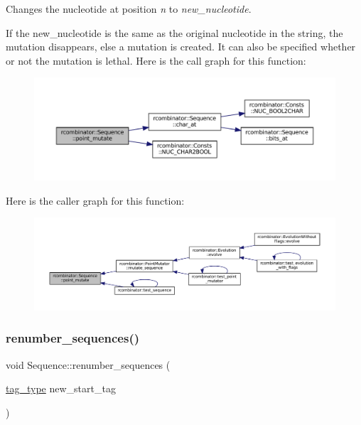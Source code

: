 Changes the nucleotide at position {\itshape n} to {\itshape new\+\_\+nucleotide}. 

If the new\+\_\+nucleotide is the same as the original nucleotide in the string, the mutation disappears, else a mutation is created. It can also be specified whether or not the mutation is lethal. Here is the call graph for this function\+:
\nopagebreak
\begin{figure}[H]
\begin{center}
\leavevmode
\includegraphics[width=350pt]{classrcombinator_1_1Sequence_a85299c3dbf2efb993a43acc2e42fcb00_cgraph}
\end{center}
\end{figure}
Here is the caller graph for this function\+:
\nopagebreak
\begin{figure}[H]
\begin{center}
\leavevmode
\includegraphics[width=350pt]{classrcombinator_1_1Sequence_a85299c3dbf2efb993a43acc2e42fcb00_icgraph}
\end{center}
\end{figure}
\mbox{\label{classrcombinator_1_1Sequence_ad4791ec3cefbea417081cd349ac6c23b}} 
\subsubsection{\texorpdfstring{renumber\+\_\+sequences()}{renumber\_sequences()}}
{\footnotesize\ttfamily void Sequence\+::renumber\+\_\+sequences (\begin{DoxyParamCaption}\item[{\mbox{\hyperlink{constants_8h_a3e6daf1646e952257330d8cfe20e96f8}{tag\+\_\+type}}}]{new\+\_\+start\+\_\+tag }\end{DoxyParamCaption})\hspace{0.3cm}{\ttfamily [static]}}



